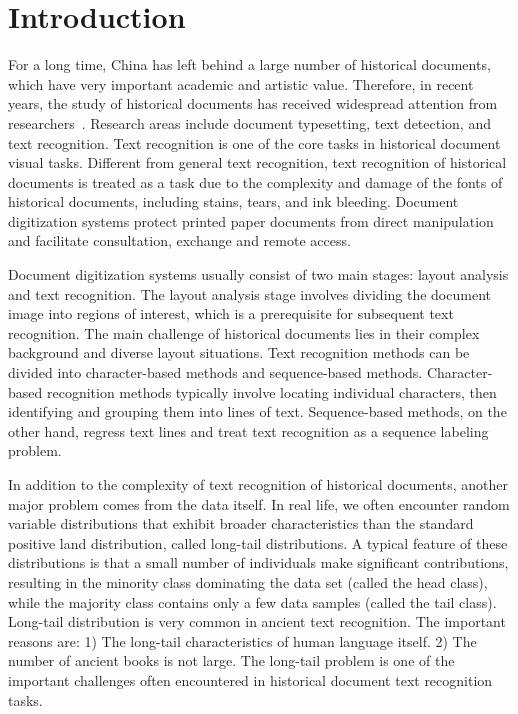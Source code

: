 \section{Introduction}

For a long time, China has left behind a large number of historical documents, which have very important academic and artistic value. 
Therefore, in recent years, the study of historical documents has received widespread attention from researchers~\cite{}. 
Research areas include document typesetting, text detection, and text recognition. Text recognition is one of the core tasks in historical document visual tasks. Different from general text recognition, text recognition of historical documents is treated as a task due to the complexity and damage of the fonts of historical documents, including stains, tears, and ink bleeding. Document digitization systems protect printed paper documents from direct manipulation and facilitate consultation, exchange and remote access.

Document digitization systems usually consist of two main stages: layout analysis and text recognition. The layout analysis stage involves dividing the document image into regions of interest, which is a prerequisite for subsequent text recognition. The main challenge of historical documents lies in their complex background and diverse layout situations. Text recognition methods can be divided into character-based methods and sequence-based methods. Character-based recognition methods typically involve locating individual characters, then identifying and grouping them into lines of text. Sequence-based methods, on the other hand, regress text lines and treat text recognition as a sequence labeling problem.


In addition to the complexity of text recognition of historical documents, another major problem comes from the data itself. In real life, we often encounter random variable distributions that exhibit broader characteristics than the standard positive land distribution, called long-tail distributions. A typical feature of these distributions is that a small number of individuals make significant contributions, resulting in the minority class dominating the data set (called the head class), while the majority class contains only a few data samples (called the tail class). Long-tail distribution is very common in ancient text recognition. The important reasons are: 1) The long-tail characteristics of human language itself. 2) The number of ancient books is not large. The long-tail problem is one of the important challenges often encountered in historical document text recognition tasks.

